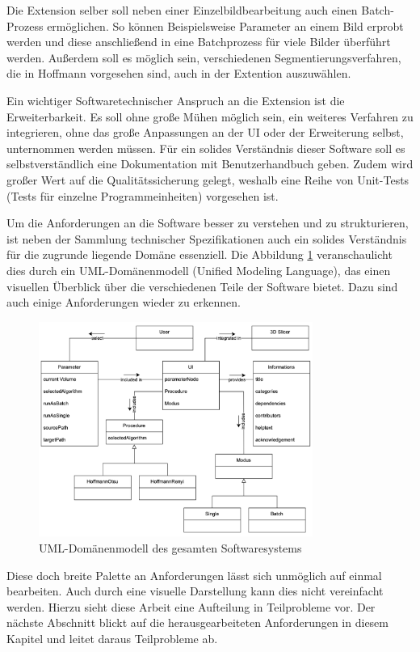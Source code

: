 Die Extension selber soll neben einer Einzelbildbearbeitung auch einen Batch-Prozess
ermöglichen. So können Beispielsweise Parameter an einem Bild erprobt werden und
diese anschließend in eine Batchprozess für viele Bilder überführt werden. Außerdem
soll es möglich sein, verschiedenen Segmentierungsverfahren, die in Hoffmann vorgesehen
sind, auch in der Extention auszuwählen.

Ein wichtiger Softwaretechnischer Anspruch an die Extension ist die
Erweiterbarkeit. Es soll ohne große Mühen möglich sein, ein weiteres Verfahren
zu integrieren, ohne das große Anpassungen an der UI oder der Erweiterung selbst,
unternommen werden müssen. Für ein solides Verständnis dieser Software soll es selbstverständlich
eine Dokumentation mit Benutzerhandbuch geben. Zudem wird großer Wert auf die
Qualitätssicherung gelegt, weshalb eine Reihe von Unit-Tests (Tests für einzelne
Programmeinheiten) vorgesehen ist.

Um die Anforderungen an die Software besser zu verstehen und zu strukturieren,
ist neben der Sammlung technischer Spezifikationen auch ein solides Verständnis
für die zugrunde liegende Domäne essenziell. Die Abbildung \ref{fig:3d_slicer_domäne}
veranschaulicht dies durch ein UML-Domänenmodell (Unified Modeling Language),
das einen visuellen Überblick über die verschiedenen Teile der Software bietet. Dazu
sind auch einige Anforderungen wieder zu erkennen.

\begin{figure}[h]
	\centering
	\includegraphics[width=0.8\textwidth]{img/domaenenmodell.jpg}
	\caption{UML-Domänenmodell des gesamten Softwaresystems}
	\label{fig:3d_slicer_domäne}
\end{figure}

Diese doch breite Palette an Anforderungen lässt sich unmöglich auf einmal
bearbeiten. Auch durch eine visuelle Darstellung kann dies nicht vereinfacht werden.
Hierzu sieht diese Arbeit eine Aufteilung in Teilprobleme vor. Der nächste Abschnitt
blickt auf die herausgearbeiteten Anforderungen in diesem Kapitel und leitet daraus
Teilprobleme ab.

